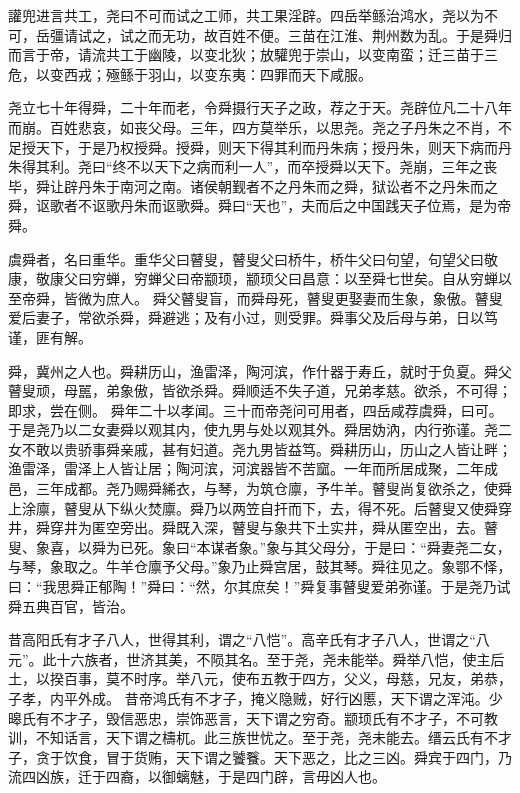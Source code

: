 \documentclass[UTF8,12pt,AutoFakeBold]{ctexart}
\begin{document}
	讙兜进言共工，尧曰不可而试之工师，共工果淫辟。四岳举鲧治鸿水，尧以为不可，岳彊请试之，试之而无功，故百姓不便。三苗在江淮、荆州数为乱。于是舜归而言于帝，请流共工于幽陵，以变北狄；放驩兜于崇山，以变南蛮；迁三苗于三危，以变西戎；殛鲧于羽山，以变东夷：四罪而天下咸服。
	\par
	尧立七十年得舜，二十年而老，令舜摄行天子之政，荐之于天。尧辟位凡二十八年而崩。百姓悲哀，如丧父母。三年，四方莫举乐，以思尧。尧之子丹朱之不肖，不足授天下，于是乃权授舜。授舜，则天下得其利而丹朱病；授丹朱，则天下病而丹朱得其利。尧曰“终不以天下之病而利一人”，而卒授舜以天下。尧崩，三年之丧毕，舜让辟丹朱于南河之南。诸侯朝觐者不之丹朱而之舜，狱讼者不之丹朱而之舜，讴歌者不讴歌丹朱而讴歌舜。舜曰“天也”，夫而后之中国践天子位焉，是为帝舜。
	\par
	虞舜者，名曰重华。重华父曰瞽叟，瞽叟父曰桥牛，桥牛父曰句望，句望父曰敬康，敬康父曰穷蝉，穷蝉父曰帝颛顼，颛顼父曰昌意：以至舜七世矣。自从穷蝉以至帝舜，皆微为庶人。
	舜父瞽叟盲，而舜母死，瞽叟更娶妻而生象，象傲。瞽叟爱后妻子，常欲杀舜，舜避逃；及有小过，则受罪。舜事父及后母与弟，日以笃谨，匪有解。
	\par
	舜，冀州之人也。舜耕历山，渔雷泽，陶河滨，作什器于寿丘，就时于负夏。舜父瞽叟顽，母嚚，弟象傲，皆欲杀舜。舜顺适不失子道，兄弟孝慈。欲杀，不可得；即求，尝在侧。
	舜年二十以孝闻。三十而帝尧问可用者，四岳咸荐虞舜，曰可。于是尧乃以二女妻舜以观其内，使九男与处以观其外。舜居妫汭，内行弥谨。尧二女不敢以贵骄事舜亲戚，甚有妇道。尧九男皆益笃。舜耕历山，历山之人皆让畔；渔雷泽，雷泽上人皆让居；陶河滨，河滨器皆不苦窳。一年而所居成聚，二年成邑，三年成都。尧乃赐舜絺衣，与琴，为筑仓廪，予牛羊。瞽叟尚复欲杀之，使舜上涂廪，瞽叟从下纵火焚廪。舜乃以两笠自扞而下，去，得不死。后瞽叟又使舜穿井，舜穿井为匿空旁出。舜既入深，瞽叟与象共下土实井，舜从匿空出，去。瞽叟、象喜，以舜为已死。象曰“本谋者象。”象与其父母分，于是曰：“舜妻尧二女，与琴，象取之。牛羊仓廪予父母。”象乃止舜宫居，鼓其琴。舜往见之。象鄂不怿，曰：“我思舜正郁陶！”舜曰：“然，尔其庶矣！”舜复事瞽叟爱弟弥谨。于是尧乃试舜五典百官，皆治。
	\par
	昔高阳氏有才子八人，世得其利，谓之“八恺”。高辛氏有才子八人，世谓之“八元”。此十六族者，世济其美，不陨其名。至于尧，尧未能举。舜举八恺，使主后土，以揆百事，莫不时序。举八元，使布五教于四方，父义，母慈，兄友，弟恭，子孝，内平外成。
	昔帝鸿氏有不才子，掩义隐贼，好行凶慝，天下谓之浑沌。少暤氏有不才子，毁信恶忠，崇饰恶言，天下谓之穷奇。颛顼氏有不才子，不可教训，不知话言，天下谓之檮杌。此三族世忧之。至于尧，尧未能去。缙云氏有不才子，贪于饮食，冒于货贿，天下谓之饕餮。天下恶之，比之三凶。舜宾于四门，乃流四凶族，迁于四裔，以御螭魅，于是四门辟，言毋凶人也。
	
\end{document}
